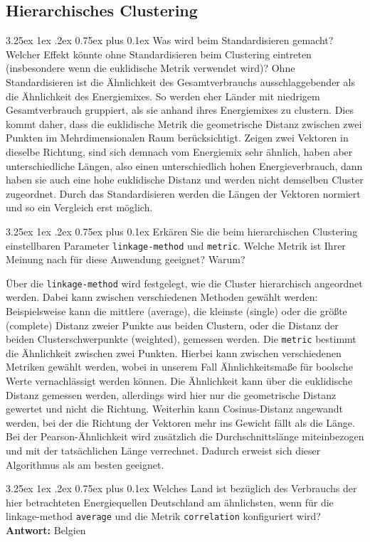 \documentclass[12pt,a4paper]{scrartcl}
\makeatletter
\renewcommand\subparagraph{\@startsection{subparagraph}{5}{\parindent}%
    {3.25ex \@plus1ex \@minus .2ex}%
    {0.75ex plus 0.1ex}%
    {\normalfont\normalsize\bfseries}}
\makeatother
\begin{document}
\subsection*{Hierarchisches Clustering}
\subparagraph{Was wird beim Standardisieren gemacht? Welcher Effekt k\"onnte ohne Standardisieren beim Clustering eintreten (insbesondere wenn die euklidische Metrik verwendet wird)?}
Ohne Standardisieren ist die \"Ahnlichkeit des Gesamtverbrauchs ausschlaggebender als die \"Ahnlichkeit des Energiemixes. So werden eher L\"ander mit niedrigem Gesamtverbrauch gruppiert, als sie anhand ihres Energiemixes zu clustern. Dies kommt daher, dass die euklidische Metrik die geometrische Distanz zwischen zwei Punkten im Mehrdimensionalen Raum ber\"ucksichtigt. Zeigen zwei Vektoren in dieselbe Richtung, sind sich demnach vom Energiemix sehr \"ahnlich, haben aber unterschiedliche L\"angen, also einen unterschiedlich hohen Energieverbrauch, dann haben sie auch eine hohe euklidische Distanz und werden nicht demselben Cluster zugeordnet.
Durch das Standardisieren werden die L\"angen der Vektoren normiert und so ein Vergleich erst m\"oglich.

\subparagraph{Erk\"aren Sie die beim hierarchischen Clustering einstellbaren Parameter \lstinline{linkage-method} und \lstinline{metric}. Welche Metrik ist Ihrer Meinung nach f\"ur diese Anwendung geeignet? Warum?}

\"Uber die \lstinline{linkage-method} wird festgelegt, wie die Cluster hierarchisch angeordnet werden. Dabei kann zwischen verschiedenen Methoden gew\"ahlt werden: Beispielsweise kann die mittlere (average), die kleinste (single) oder die gr\"o\ss te (complete) Distanz zweier Punkte aus beiden Clustern, oder die Distanz der beiden Clusterschwerpunkte (weighted), gemessen werden. 
Die \lstinline{metric}  bestimmt die \"Ahnlichkeit zwischen zwei Punkten. Hierbei kann zwischen verschiedenen Metriken gew\"ahlt werden, wobei in unserem Fall \"Ahnlichkeitsma\ss e f\"ur boolsche Werte vernachl\"assigt werden k\"onnen. 
Die \"Ahnlichkeit kann \"uber die euklidische Distanz gemessen werden, allerdings wird hier nur die geometrische Distanz gewertet und nicht die Richtung. Weiterhin kann Cosinus-Distanz angewandt werden, bei der die Richtung der Vektoren mehr ins Gewicht f\"allt als die L\"ange. 
Bei der Pearson-\"Ahnlichkeit wird zus\"atzlich die Durchschnittsl\"ange miteinbezogen und mit der tats\"achlichen L\"ange verrechnet. Dadurch erweist sich dieser Algorithmus als am besten geeignet. 


\subparagraph{Welches Land ist bez\"uglich des Verbrauchs der hier betrachteten Energiequellen Deutschland am \"ahnlichsten, wenn f\"ur die linkage-method \lstinline{average} und die Metrik \lstinline{correlation} konfiguriert wird?}
\textbf{Antwort:} Belgien
\end{document}
